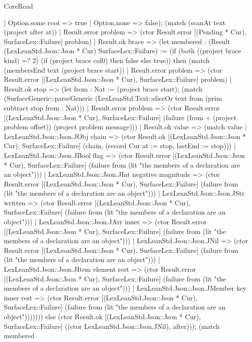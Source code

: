 \begin{lexlean}{CoreRead}
\begin{semanticmodule}
{        | Option.some root => true
        | Option.none => false); (match (scanAt text (project after at))
        | Result.error problem => (ctor Result.error [(Pending * Cur), SurfaceLex::Failure] problem)
        | Result.ok brace => (let membered : (Result (LexLeanStd.Json::Json * Cur) SurfaceLex::Failure) := (if (both ((project brace kind) =? 2) (if (project brace col0) then false else true)) then (match (membersEnd text (project brace start))
          | Result.error problem => (ctor Result.error [(LexLeanStd.Json::Json * Cur), SurfaceLex::Failure] problem)
          | Result.ok stop => (let from : Nat := (project brace start); (match (SurfaceGeneric::parseGeneric (LexLeanStd.Text::sliceOr text from (prim subtract stop from : Nat)))
            | Result.error problem => (ctor Result.error [(LexLeanStd.Json::Json * Cur), SurfaceLex::Failure] (failure (from + (project problem offset)) (project problem message)))
            | Result.ok value => (match value
              | LexLeanStd.Json::Json.JObj chain => (ctor Result.ok [(LexLeanStd.Json::Json * Cur), SurfaceLex::Failure] (chain, (record Cur {at := stop, lastEnd := stop})))
              | LexLeanStd.Json::Json.JBool flag => (ctor Result.error [(LexLeanStd.Json::Json * Cur), SurfaceLex::Failure] (failure from (lit "the members of a declaration are an object")))
              | LexLeanStd.Json::Json.JInt negative magnitude => (ctor Result.error [(LexLeanStd.Json::Json * Cur), SurfaceLex::Failure] (failure from (lit "the members of a declaration are an object")))
              | LexLeanStd.Json::Json.JStr written => (ctor Result.error [(LexLeanStd.Json::Json * Cur), SurfaceLex::Failure] (failure from (lit "the members of a declaration are an object")))
              | LexLeanStd.Json::Json.JArr inner => (ctor Result.error [(LexLeanStd.Json::Json * Cur), SurfaceLex::Failure] (failure from (lit "the members of a declaration are an object")))
              | LexLeanStd.Json::Json.JNil => (ctor Result.error [(LexLeanStd.Json::Json * Cur), SurfaceLex::Failure] (failure from (lit "the members of a declaration are an object")))
              | LexLeanStd.Json::Json.JItem element rest => (ctor Result.error [(LexLeanStd.Json::Json * Cur), SurfaceLex::Failure] (failure from (lit "the members of a declaration are an object")))
              | LexLeanStd.Json::Json.JMember key inner rest => (ctor Result.error [(LexLeanStd.Json::Json * Cur), SurfaceLex::Failure] (failure from (lit "the members of a declaration are an object"))))))) else (ctor Result.ok [(LexLeanStd.Json::Json * Cur), SurfaceLex::Failure] ((ctor LexLeanStd.Json::Json.JNil), after))); (match membered
}
\end{semanticmodule}
\end{lexlean}
